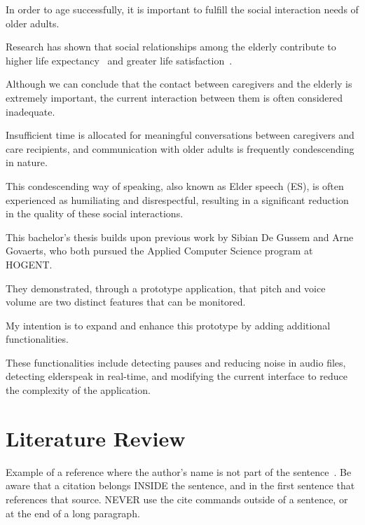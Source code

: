 \documentclass[english]{hogent-article}
\begin{document}
In order to age successfully, it is important to fulfill the social interaction needs of older adults.

Research has shown that social relationships among the elderly contribute to higher life expectancy~\autocite{Rodriguez-Laso2007} and greater life satisfaction~\autocite{Okamoto2008-eh}.

Although we can conclude that the contact between caregivers and the elderly is extremely important, the current interaction between them is often considered inadequate.

Insufficient time is allocated for meaningful conversations between caregivers and care recipients, and communication with older adults is frequently condescending in nature.

This condescending way of speaking, also known as Elder speech (ES), is often experienced as humiliating and disrespectful, resulting in a significant reduction in the quality of these social interactions.

This bachelor's thesis builds upon previous work by Sibian De Gussem and Arne Govaerts, who both pursued the Applied Computer Science program at HOGENT.

They demonstrated, through a prototype application, that pitch and voice volume are two distinct features that can be monitored.

My intention is to expand and enhance this prototype by adding additional functionalities.

These functionalities include detecting pauses and reducing noise in audio files, detecting elderspeak in real-time, and modifying the current interface to reduce the complexity of the application.

\section{Literature Review}%
\label{sec:literature review}


Example of a reference where the author's name is not part of the sentence~\autocite{Moore2002}. Be aware that a citation belongs INSIDE the sentence, and in the first sentence that references that source. NEVER use the cite commands outside of a sentence, or at the end of a long paragraph.
\end{document}
